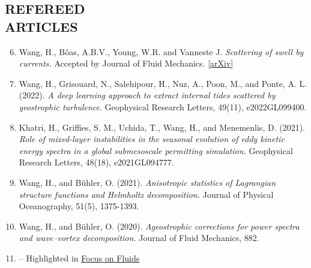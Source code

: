 \documentclass[margin]{res}
\newenvironment{benumerate}[1]{
    \let\oldItem\item
    \def\item{\addtocounter{enumi}{-2}\oldItem}
    \begin{enumerate}[leftmargin=*,noitemsep]
    \setcounter{enumi}{#1}
    \addtocounter{enumi}{1}
}{
    \end{enumerate}
}
\begin{document}
\begin{resume}


\section{{\normalfont REFEREED\\ARTICLES}}
\begin{benumerate}{5}
\item Wang, H., B\^{o}as, A.B.V., Young, W.R. and Vanneste J. \textit{Scattering of swell by currents.} Accepted by Journal of Fluid Mechanics. \href{https://arxiv.org/abs/2305.12163}{[arXiv]}
\item Wang, H., Grisouard, N., Salehipour, H., Nuz, A., Poon, M., and Ponte, A. L. (2022). \textit{A deep learning approach to extract internal tides scattered by geostrophic turbulence}. Geophysical Research Letters, 49(11), e2022GL099400.
\item Khatri, H., Griffies, S. M., Uchida, T., Wang, H.,  and Menemenlis, D. (2021). \textit{Role of mixed-layer instabilities in the seasonal evolution of eddy kinetic energy spectra in a global submesoscale permitting simulation.} Geophysical Research Letters, 48(18), e2021GL094777.
\item Wang, H., and B{\"u}hler, O. (2021). \textit{Anisotropic statistics of Lagrangian structure functions and Helmholtz decomposition.} Journal of Physical Oceanography, 51(5), 1375-1393.
\item Wang, H., and B{\"u}hler, O. (2020). \textit{Ageostrophic corrections for power spectra and wave–vortex decomposition.} Journal of Fluid Mechanics, 882.
\item[] -- Highlighted in \href{https://www.cambridge.org/core/journals/journal-of-fluid-mechanics/article/untangling-waves-and-vortices-in-the-atmospheric-kinetic-energy-spectra/1BEB1ABC32CD2CFAB99BAFEE4712CD0C}{Focus on Fluids}
\end{benumerate}


\end{resume}
\end{document}
